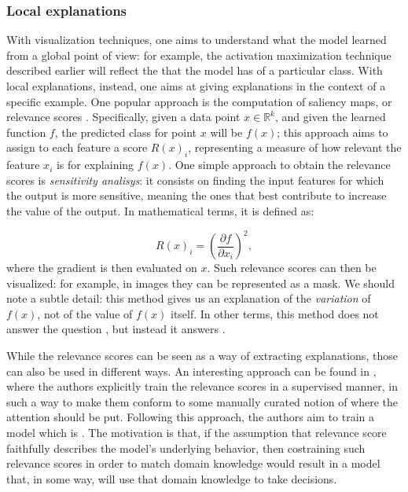 \subsubsection{Local explanations}
 With visualization techniques, one aims to understand what the model learned from a global point of view: for example, the activation maximization technique described earlier will reflect the  that the model has of a particular class. With local explanations, instead, one aims at giving explanations in the context of a specific example. One popular approach is the computation of saliency maps, or relevance scores \cite{simonyan2013deep, montavon2018methods, wang2016dueling}. Specifically, given a data point $x \in \mathbb{R}^k$, and given the learned function $f$, the predicted class for point $x$ will be $f(x)$; this approach aims to assign to each feature a score $R(x)_ i$, representing a measure of how relevant the feature $x_i$ is for explaining $f(x)$. One simple approach to obtain the relevance scores is \textit{sensitivity analisys}: it consists on finding the input features for which the output is more sensitive, meaning the ones that best contribute to increase the value of the output. In mathematical terms, it is defined as:

$$R(x)_i = \left( \frac{\partial f}{\partial x_i} \right)^2, $$
where the gradient is then evaluated on $x$. Such relevance scores can then be visualized: for example, in images they can be represented as a mask. We should note a subtle detail: this method gives us an explanation of the \textit{variation} of $f(x)$, not of the value of $f(x)$ itself. In other terms, this method does not answer the question \textit{}, but instead it answers \textit{}.

While the relevance scores can be seen as a way of extracting explanations, those can also be used in different ways. An interesting approach can be found in \cite{ross2017right}, where the authors explicitly train the relevance scores in a supervised manner, in such a way to make them conform to some manually curated notion of where the attention should be put. Following this approach, the authors aim to train a model which is . The motivation is that, if the assumption that relevance score faithfully describes the model's underlying behavior, then costraining such relevance scores in order to match domain knowledge would result in a model that, in some way, will use that domain knowledge to take decisions.

